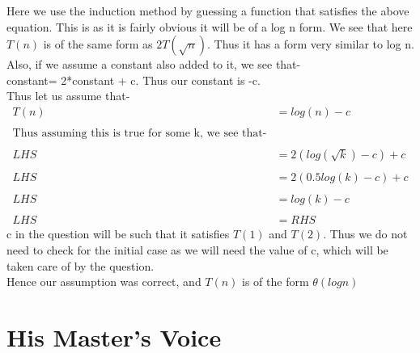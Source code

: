 \documentclass[a4paper,10pt]{article}
\newenvironment{answer}[1][height fill] {
    \begin{tcolorbox}[#1]
}
{
    \end{tcolorbox}
}
\begin{document}
\begin{answer}
    Here we use the induction method by guessing a function that satisfies the above equation. This is as it is fairly obvious it will be of a log n form.
    We see that here $T(n)$ is of the same form as $2T(\sqrt{n})$. Thus it has a form very similar to log n. 
    Also, if we assume a constant also added to it, we see that- \\
    constant= 2*constant + c. Thus our constant is -c.\\
    Thus let us assume that-
    \begin{align*}
        
         T(n) &= log(n)-c\\\\
         \mbox{Thus assuming this is true for some k, we see that-}\\\\
         LHS &= 2(log(\sqrt{k})-c)+c\\\\
         LHS   &= 2(0.5log(k)-c)+c\\\\
        LHS &= log(k)-c\\\\
           LHS  &= RHS
    \end{align*}
    c in the question will be such that it satisfies $T(1)$ and $T(2)$. Thus we do not need to check for the initial case as we will need the value of c, which will be taken care of by the question.\\
    Hence our assumption was correct, and $T(n)$ is of the form $\theta(log n)$
    
\end{answer}



\section{His Master's Voice}
\end{document}
